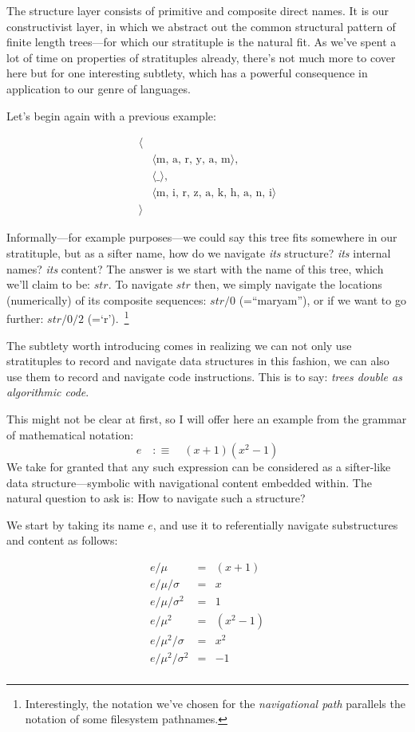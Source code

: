 \documentclass[twoside]{article}
\begin{document}
The structure layer consists of primitive and composite direct names. It is our constructivist layer, in which we
abstract out the common structural pattern of finite length trees---for which our stratituple is the natural fit.
As we've spent a lot of time on properties of stratituples already, there's not much more to cover here but for
one interesting subtlety, which has a powerful consequence in application to our genre of languages.

Let's begin again with a previous example:

$$ \begin{array}{rl}
\langle							\\
 & \langle\mbox{m, a, r, y, a, m}\rangle,		\\
 & \langle\mbox{\_}\rangle,				\\
 & \langle\mbox{m, i, r, z, a, k, h, a, n, i}\rangle	\\
\rangle
\end{array} $$

Informally---for example purposes---we could say this tree fits somewhere in our stratituple, but as a sifter name,
how do we navigate \emph{its} structure? \emph{its} internal names? \emph{its} content? The answer is we start with
the name of this tree, which we'll claim to be: $ str $. To navigate $ str $ then, we simply navigate the locations
(numerically) of its composite sequences: $ str/0 $ (=``maryam''), or if we want to go further:
$ str/0/2 $ (=`r').~\footnote{Interestingly, the notation we've chosen for the \emph{navigational path}
parallels the notation of some filesystem pathnames.}

The subtlety worth introducing comes in realizing we can not only use stratituples to record and
navigate data structures in this fashion, we can also use them to record and navigate code instructions.
This is to say: \emph{trees double as algorithmic code}.

This might not be clear at first, so I will offer here an example from the grammar of mathematical notation:
$$ e\quad:\equiv\quad (x+1)(x^2-1) $$
We take for granted that any such expression can be considered as a sifter-like data structure---symbolic
with navigational content embedded within. The natural question to ask is: How to navigate such a structure?

We start by taking its name $ e $, and use it to referentially navigate substructures and content as follows:

$$ \begin{array}{lcl}
e/\mu			& = & (x+1)	\\
e/\mu/\sigma		& = & x		\\
e/\mu/\sigma^2		& = & 1		\\
e/\mu^2			& = & (x^2-1)	\\
e/\mu^2/\sigma		& = & x^2	\\
e/\mu^2/\sigma^2	& = & -1	\\
\end{array} $$
\end{document}
